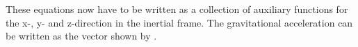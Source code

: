 %
%

\noindent
These equations now have to be written as a collection of auxiliary functions for the x-, y- and z-direction in the inertial frame. The gravitational acceleration can be written as the vector shown by .

